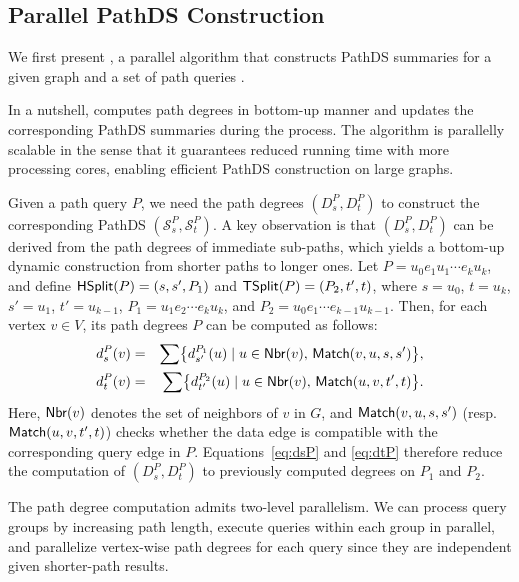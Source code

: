 \subsection{Parallel PathDS Construction}\label{susbsec:pds-build}

We first present , a parallel algorithm that constructs
PathDS summaries for a given graph  and a set of path queries .

\vspace{.25em} %
In a nutshell,  computes path degrees in bottom-up
manner and updates the corresponding PathDS summaries during the process.
The algorithm is parallelly scalable in the sense that it guarantees
reduced running time with more processing cores, enabling efficient
PathDS construction on large graphs.



Given a path query $P$, we need the path degrees $(D_s^P, D_t^P)$ to
construct the corresponding PathDS  $(\mathcal{S}_s^P,
\mathcal{S}_t^P)$. %
A key observation is that $(D_s^P, D_t^P)$ can be derived from the
path degrees of immediate sub-paths, which yields a bottom-up dynamic
construction from shorter paths to longer ones. Let $P=u_0e_1u_1\cdots
e_ku_k$, and define
${\mathsf{HSplit}}(P)=(s,s',P_1)$ and ${\mathsf{TSplit}}(P)=(P_2,t',t)$, where
$s=u_0$, $t=u_k$, $s'=u_1$, $t'=u_{k-1}$, $P_1=u_1e_2\cdots e_ku_k$, and
$P_2=u_0e_1\cdots e_{k-1}u_{k-1}$. Then, for each vertex $v\in V$, its
path degrees \wrt $P$ can be computed as follows:
\begin{eqnarray}
  d_s^{P}(v) & = &\sum\bigl\{ d_{s'}^{P_1}(u)\mid u\in
  {\ensuremath {\mathsf{Nbr}}}(v),\,{\mathsf{Match}}(v,u,s,s')\bigr\}, \label{eq:dsP}\\
  d_t^{P}(v) & = &\sum\bigl\{ d_{t'}^{P_2}(u)\mid u\in {\ensuremath {\mathsf{Nbr}}}(v),\,{\mathsf{Match}}(u,v,t',t)\bigr\}. \label{eq:dtP}
\end{eqnarray}
Here, ${\mathsf{Nbr}}(v)$ denotes the set of neighbors of $v$ in $G$, and
${\mathsf{Match}}(v,u,s,s')$ (resp. ${\mathsf{Match}}(u,v,t',t)$) checks whether the
data edge is compatible with the corresponding query edge in $P$.
Equations~\eqref{eq:dsP} and \eqref{eq:dtP} therefore reduce the
computation of $(D_s^P, D_t^P)$ to previously computed degrees on $P_1$
and $P_2$. 

The path degree computation admits two-level parallelism. We can
process query groups by increasing path length, execute queries within
each group in parallel, and parallelize vertex-wise path degrees for
each query since they are independent given shorter-path results.



